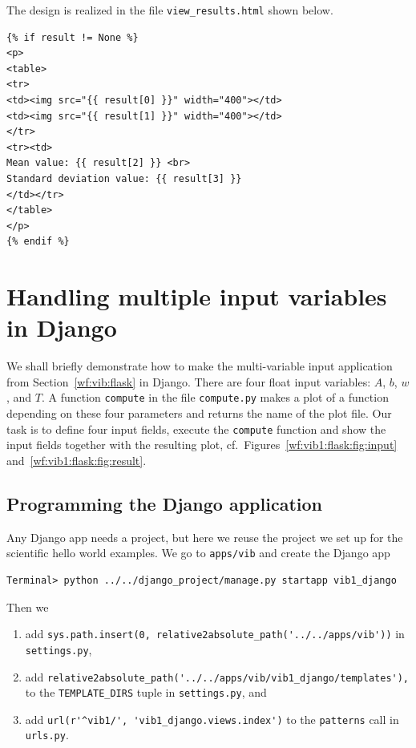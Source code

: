 \documentclass[%
oneside,                 %
final,                   %
10pt]{article}
\begin{document}
The design is realized in the file \Verb!view_results.html! shown below.

\begin{Verbatim}[numbers=none,fontsize=\fontsize{9pt}{9pt},baselinestretch=0.85]
{% if result != None %}
<p>
<table>
<tr>
<td><img src="{{ result[0] }}" width="400"></td>
<td><img src="{{ result[1] }}" width="400"></td>
</tr>
<tr><td>
Mean value: {{ result[2] }} <br>
Standard deviation value: {{ result[3] }}
</td></tr>
</table>
</p>
{% endif %}
\end{Verbatim}



\section{Handling multiple input variables in Django}
\label{wf:vib:django}

We shall briefly demonstrate how to make the multi-variable input
application from Section~\ref{wf:vib:flask} in Django.
There are four float input variables: $A$, $b$, $w$, and $T$.
A function \Verb!compute! in the file \Verb!compute.py! makes
a plot of a function depending on these four parameters and returns
the name of the plot file. Our task is to define four input fields,
execute the \Verb!compute! function and show the input fields together with
the resulting plot, cf.~Figures~\ref{wf:vib1:flask:fig:input}
and~\ref{wf:vib1:flask:fig:result}.

\subsection{Programming the Django application}




Any Django app needs a project, but here we reuse the project
we set up for the scientific hello world examples. We go to
\Verb!apps/vib! and create the Django app

\begin{Verbatim}[numbers=none,fontsize=\fontsize{9pt}{9pt},baselinestretch=0.85]
Terminal> python ../../django_project/manage.py startapp vib1_django
\end{Verbatim}
Then we

\begin{enumerate}
\item add \Verb!sys.path.insert(0, relative2absolute_path('../../apps/vib'))!
   in \Verb!settings.py!,

\item add \Verb!relative2absolute_path('../../apps/vib/vib1_django/templates'),!
   to the \Verb!TEMPLATE_DIRS! tuple in \Verb!settings.py!, and

\item add \Verb!url(r'^vib1/', 'vib1_django.views.index')! to the \Verb!patterns!
   call in \Verb!urls.py!.
\end{enumerate}
\end{document}
